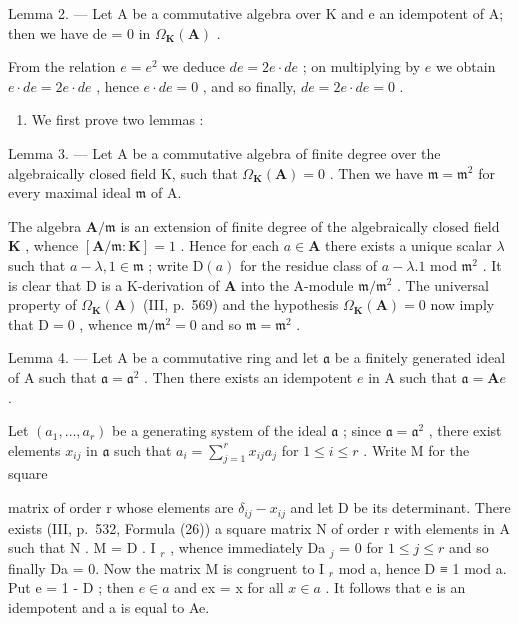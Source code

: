 Lemma 2. --- Let A be a commutative algebra over K and e an idempotent of A; then we have de = 0 in \(\Omega_{\mathbf{K}}(\mathbf{A})\) .

From the relation \(e = e^2\) we deduce \(de = 2e \cdot de\) ; on multiplying by \(e\) we obtain \(e \cdot de = 2e \cdot de\) , hence \(e \cdot de = 0\) , and so finally, \(de = 2e \cdot de = 0\) .

\begin{enumerate}
\def\labelenumi{\Alph{enumi})}
\setcounter{enumi}{2}
\tightlist
\item
  We first prove two lemmas :
\end{enumerate}

Lemma 3. --- Let A be a commutative algebra of finite degree over the algebraically closed field K, such that \(\Omega_{\mathbf{K}}(\mathbf{A}) = 0\) . Then we have \(\mathfrak{m} = \mathfrak{m}^2\) for every maximal ideal \(\mathfrak{m}\) of A.

The algebra \(\mathbf{A} / \mathfrak{m}\) is an extension of finite degree of the algebraically closed field \(\mathbf{K}\) , whence \([\mathbf{A} / \mathfrak{m}:\mathbf{K}] = 1\) . Hence for each \(a\in \mathbf{A}\) there exists a unique scalar \(\lambda\) such that \(a - \lambda ,1\in \mathfrak{m}\) ; write \(\mathrm{D}(a)\) for the residue class of \(a - \lambda .1\) mod \(\mathfrak{m}^2\) . It is clear that \(\mathrm{D}\) is a K-derivation of \(\mathbf{A}\) into the A-module \(\mathfrak{m} / \mathfrak{m}^2\) . The universal property of \(\Omega_{\mathbf{K}}(\mathbf{A})\) (III, p.~569) and the hypothesis \(\Omega_{\mathbf{K}}(\mathbf{A}) = 0\) now imply that \(\mathrm{D} = 0\) , whence \(\mathfrak{m} / \mathfrak{m}^2 = 0\) and so \(\mathfrak{m} = \mathfrak{m}^2\) .

Lemma 4. --- Let A be a commutative ring and let \(\mathfrak{a}\) be a finitely generated ideal of A such that \(\mathfrak{a} = \mathfrak{a}^2\) . Then there exists an idempotent \(e\) in A such that \(\mathfrak{a} = \mathbf{A}e\) .

Let \((a_{1},\ldots ,a_{r})\) be a generating system of the ideal \(\mathfrak{a}\) ; since \(\mathfrak{a} = \mathfrak{a}^2\) , there exist elements \(x_{ij}\) in \(\mathfrak{a}\) such that \(a_{i} = \sum_{j = 1}^{r}x_{ij}a_{j}\) for \(1\leqslant i\leqslant r\) . Write M for the square

matrix of order r whose elements are \(\delta_{ij} - x_{ij}\) and let D be its determinant. There exists (III, p.~532, Formula (26)) a square matrix N of order r with elements in A such that N . M = D . I \(_{r}\) , whence immediately Da \(_{j}\) = 0 for \(1 \leqslant j \leqslant r\) and so finally Da = 0. Now the matrix M is congruent to I \(_{r}\) mod a, hence D ≡ 1 mod a. Put e = 1 - D ; then \(e \in a\) and ex = x for all \(x \in a\) . It follows that e is an idempotent and a is equal to Ae.

